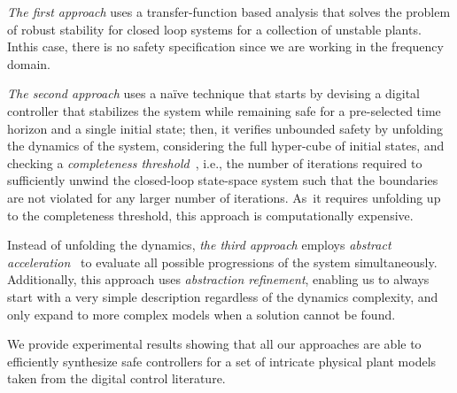 \documentclass[twocolumn]{autart}    %
\begin{document}
{\em The first  approach} uses a transfer-function based analysis that
solves the problem of robust stability for closed loop systems for a
collection of unstable plants.  Inthis case, there is no safety
specification since we are working in the frequency domain.

{\em The second approach} uses a na\"ive technique that starts by devising a
digital controller that stabilizes the system while remaining safe for a
pre-selected time horizon and a single initial state; then, it verifies
unbounded safety by unfolding the dynamics of the system, considering the
full hyper-cube of initial states, and checking a {\em completeness
threshold}~\cite{DBLP:conf/vmcai/KroeningS03}, i.e., the number of
iterations required to sufficiently unwind the closed-loop state-space
system such that the boundaries are not violated for any larger number of
iterations.  As~it requires unfolding up to the completeness threshold, this
approach is computationally expensive.

Instead of unfolding the dynamics, {\em the third approach}
employs {\em abstract acceleration}~\cite{cattaruzza2015unbounded} to
evaluate all possible progressions of the system simultaneously. 
Additionally, this approach uses {\em abstraction refinement},
enabling us to always start with a very simple description regardless of the
dynamics complexity, and only expand to more complex models
when a solution cannot be found.

We provide experimental results showing that all our approaches are able to
efficiently synthesize safe controllers for a set of intricate physical
plant models taken from the digital control literature.
\end{document}
